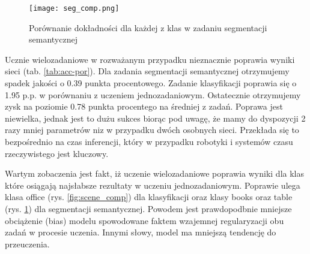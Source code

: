 \begin{figure}
    \centering
    \texttt{[image: seg\_comp.png]}
    \caption{Porównanie dokładności dla każdej z klas w zadaniu segmentacji semantycznej}
    \label{fig:seg_comp}
\end{figure}
Ucznie wielozadaniowe w rozważanym przypadku nieznacznie poprawia wyniki sieci (tab. \ref{tab:acc-por}). Dla zadania segmentacji semantycznej otrzymujemy spadek jakości o 0.39 punkta procentowego. Zadanie klasyfikacji poprawia się o 1.95 p.p. w porównaniu z uczeniem jednozadaniowym. Ostatecznie otrzymujemy zysk na poziomie 0.78 punkta procentego na średniej z zadań. Poprawa jest niewielka, jednak jest to dużu sukces biorąc pod uwagę, że mamy do dyspozycji 2 razy mniej parametrów niz w przypadku dwóch osobnych sieci. Przekłada się to bezpośrednio na czas inferencji, który w przypadku robotyki i systemów czasu rzeczywistego jest kluczowy.

Wartym zobaczenia jest fakt, iż uczenie wielozadaniowe poprawia wyniki dla klas które osiągają najsłabsze rezultaty w uczeniu jednozadaniowym. Poprawie ulega klasa office (rys. \ref{fig:scene_comp}) dla klasyfikacji oraz klasy books oraz table (rys. \ref{fig:seg_comp}) dla segmentacji semantycznej. Powodem jest prawdopodbnie mniejsze obciążenie (bias) modelu spowodowane faktem wzajemnej regularyzacji obu zadań w procesie uczenia. Innymi słowy, model ma mniejszą tendencję do przeuczenia.